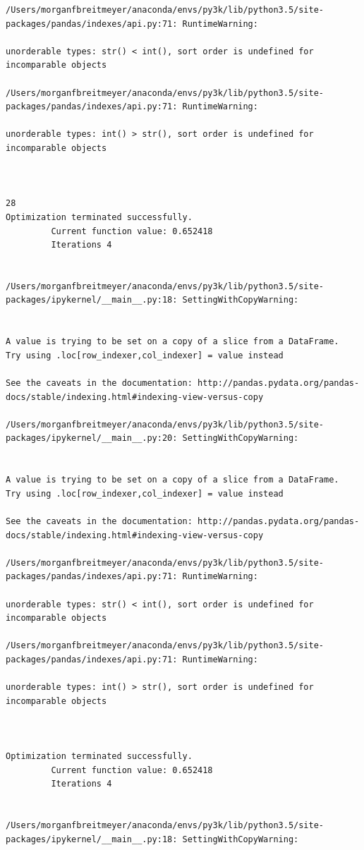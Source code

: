 \begin{lstlisting}
/Users/morganfbreitmeyer/anaconda/envs/py3k/lib/python3.5/site-packages/pandas/indexes/api.py:71: RuntimeWarning:

unorderable types: str() < int(), sort order is undefined for incomparable objects

/Users/morganfbreitmeyer/anaconda/envs/py3k/lib/python3.5/site-packages/pandas/indexes/api.py:71: RuntimeWarning:

unorderable types: int() > str(), sort order is undefined for incomparable objects



28
Optimization terminated successfully.
         Current function value: 0.652418
         Iterations 4


/Users/morganfbreitmeyer/anaconda/envs/py3k/lib/python3.5/site-packages/ipykernel/__main__.py:18: SettingWithCopyWarning:


A value is trying to be set on a copy of a slice from a DataFrame.
Try using .loc[row_indexer,col_indexer] = value instead

See the caveats in the documentation: http://pandas.pydata.org/pandas-docs/stable/indexing.html#indexing-view-versus-copy

/Users/morganfbreitmeyer/anaconda/envs/py3k/lib/python3.5/site-packages/ipykernel/__main__.py:20: SettingWithCopyWarning:


A value is trying to be set on a copy of a slice from a DataFrame.
Try using .loc[row_indexer,col_indexer] = value instead

See the caveats in the documentation: http://pandas.pydata.org/pandas-docs/stable/indexing.html#indexing-view-versus-copy

/Users/morganfbreitmeyer/anaconda/envs/py3k/lib/python3.5/site-packages/pandas/indexes/api.py:71: RuntimeWarning:

unorderable types: str() < int(), sort order is undefined for incomparable objects

/Users/morganfbreitmeyer/anaconda/envs/py3k/lib/python3.5/site-packages/pandas/indexes/api.py:71: RuntimeWarning:

unorderable types: int() > str(), sort order is undefined for incomparable objects



Optimization terminated successfully.
         Current function value: 0.652418
         Iterations 4


/Users/morganfbreitmeyer/anaconda/envs/py3k/lib/python3.5/site-packages/ipykernel/__main__.py:18: SettingWithCopyWarning:



\end{lstlisting}
